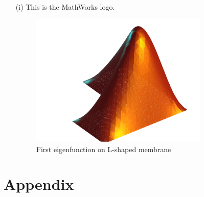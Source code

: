 \documentclass{article}
\begin{document}
\begin{itemize}
	\item[(i)] This is the MathWorks logo.
	\begin{figure}[H]
		\centering
		\includegraphics[width=0.8\textwidth]{matlab.pdf}
		\caption{First eigenfunction on L-shaped membrane}
	\end{figure}
\end{itemize}


\section*{Appendix}

\end{document}
